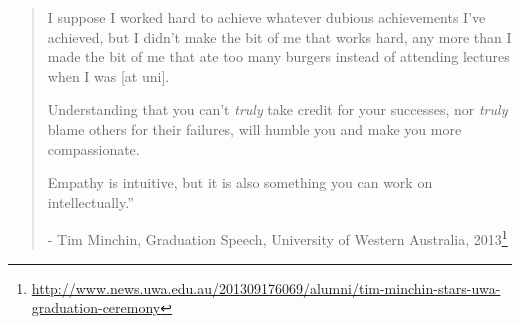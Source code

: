 \begin{quotation}
I suppose I worked hard to achieve whatever dubious achievements I've achieved, but I didn't make the bit of me that works hard, any more than I made the bit of me that ate too many burgers instead of attending lectures when I was [at uni].

Understanding that you can't \emph{truly} take credit for your successes, nor \emph{truly} blame others for their failures, will humble you and make you more compassionate. 

Empathy is intuitive, but it is also something you can work on intellectually.''\bigskip
%	
%	
%
%

%
%
%
%
%
	
	\centering - Tim Minchin, Graduation Speech, University of Western Australia, 2013\footnote{\url{http://www.news.uwa.edu.au/201309176069/alumni/tim-minchin-stars-uwa-graduation-ceremony}}
\end{quotation}

\newpage


